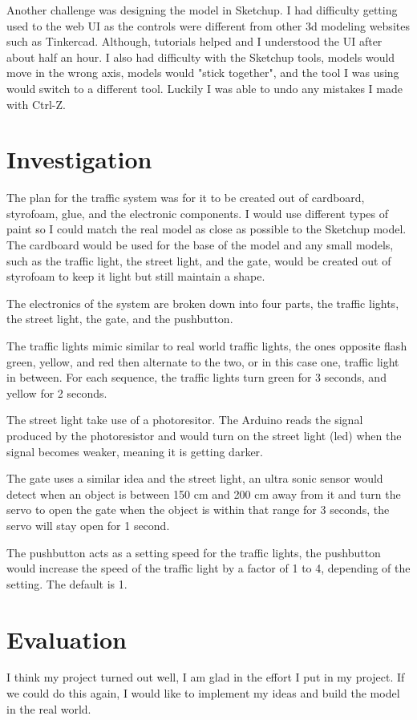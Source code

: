\documentclass[12pt]{article}
\begin{document}
\medskip
Another challenge was designing the model in Sketchup. I had difficulty getting used to the web UI as the controls were different from other 3d modeling websites such as Tinkercad. Although, tutorials helped and I understood the UI after about half an hour. I also had difficulty with the Sketchup tools, models would move in the wrong axis, models would "stick together", and the tool I was using would switch to a different tool. Luckily I was able to undo any mistakes I made with Ctrl-Z.

\section{Investigation}

The plan for the traffic system was for it to be created out of cardboard, styrofoam, glue, and the electronic components. I would use different types of paint so I could match the real model as close as possible to the Sketchup model. The cardboard would be used for the base of the model and any small models, such as the traffic light, the street light, and the gate, would be created out of styrofoam to keep it light but still maintain a shape.

The electronics of the system are broken down into four parts, the traffic lights, the street light, the gate, and the pushbutton.

The traffic lights mimic similar to real world traffic lights, the ones opposite flash green, yellow, and red then alternate to the two, or in this case one, traffic light in between. For each sequence, the traffic lights turn green for 3 seconds, and yellow for 2 seconds.

The street light take use of a photoresitor. The Arduino reads the signal produced by the photoresistor and would turn on the street light (led) when the signal becomes weaker, meaning it is getting darker.

The gate uses a similar idea and the street light, an ultra sonic sensor would detect when an object is between 150 cm and 200 cm away from it and turn the servo to open the gate when the object is within that range for 3 seconds, the servo will stay open for 1 second.

The pushbutton acts as a setting speed for the traffic lights, the pushbutton would increase the speed of the traffic light by a factor of 1 to 4, depending of the setting. The default is 1.

\section{Evaluation}
I think my project turned out well, I am glad in the effort I put in my project. If we could do this again, I would like to implement my ideas and build the model in the real world.
\end{document}
